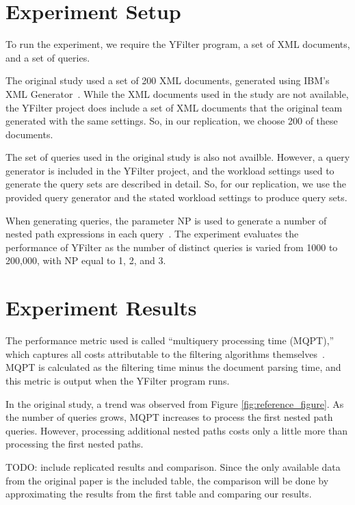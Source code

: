 \documentclass[sigconf, nonacm]{acmart}
\begin{document}
\section{Experiment Setup}

To run the experiment, we require the YFilter program, a set of XML documents, and a set of queries. 

The original study used a set of 200 XML documents, generated using IBM's XML Generator~\cite{IBM_XML}. While the XML documents used in the study are not available, the YFilter project does include a set of XML documents that the original team generated with the same settings. So, in our replication, we choose 200 of these documents.

The set of queries used in the original study is also not availble. However, a query generator is included in the YFilter project, and the workload settings used to generate the query sets are described in detail. So, for our replication, we use the provided query generator and the stated workload settings to produce query sets.

When generating queries, the parameter NP is used to generate a number of nested path expressions in each query~\cite{yfilter}. The experiment evaluates the performance of YFilter as the number of distinct queries is varied from 1000 to 200,000, with NP equal to 1, 2, and 3.

\section{Experiment Results}

The performance metric used is called ``multiquery processing time (MQPT),'' which captures all costs attributable to the filtering algorithms themselves~\cite{yfilter}. MQPT is calculated as the filtering time minus the document parsing time, and this metric is output when the YFilter program runs.

In the original study, a trend was observed from Figure \ref{fig:reference_figure}. As the number of queries grows, MQPT increases to process the first nested path queries. However, processing additional nested paths costs only a little more than processing the first nested paths.~\cite{yfilter}

TODO: include replicated results and comparison. Since the only available data from the original paper is the included table, the comparison will be done by approximating the results from the first table and comparing our results.
\end{document}
